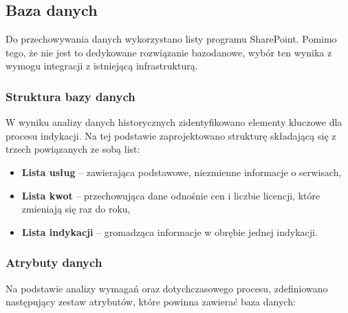\subsection{Baza danych}

Do przechowywania danych wykorzystano listy programu SharePoint. Pomimo tego, że nie jest to dedykowane rozwiązanie bazodanowe, wybór ten wynika z wymogu integracji z istniejącą infrastrukturą.

\subsubsection*{Struktura bazy danych}
\label{Subsec: StrukturaBazyDanych}
W wyniku analizy danych historycznych zidentyfikowano elementy kluczowe dla procesu indykacji. Na tej podstawie zaprojektowano strukturę składającą się z trzech powiązanych ze sobą list:

\begin{itemize}
  \item \textbf{Lista usług} -- zawierająca podstawowe, niezmienne informacje o serwisach,
  \item \textbf{Lista kwot} -- przechowująca dane odnośnie cen i liczbie licencji, które zmieniają się raz do roku,
  \item \textbf{Lista indykacji} -- gromadząca informacje w obrębie jednej indykacji.
\end{itemize}
\subsubsection*{Atrybuty danych}
Na podstawie analizy wymagań oraz dotychczasowego procesu, zdefiniowano następujący zestaw atrybutów, które powinna zawierać baza danych:

